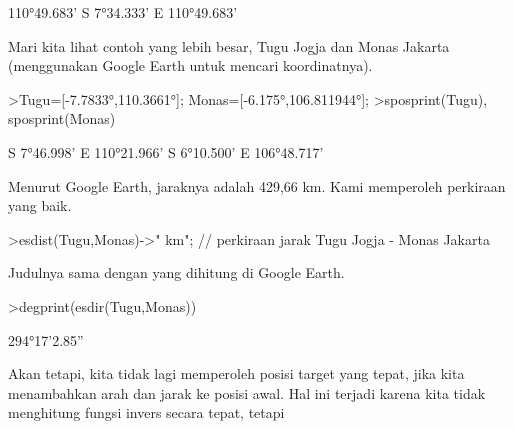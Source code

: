 \documentclass[a4paper,10pt]{article}
\begin{document}
\begin{eulernotebook}
\begin{eulercomment}
\begin{eulercomment}
\begin{eulercomment}
\begin{eulercomment}
\begin{eulercomment}
\begin{eulercomment}
\begin{eulercomment}
\begin{eulercomment}
\begin{eulercomment}
\begin{eulercomment}
\begin{eulercomment}
\begin{eulercomment}
\begin{eulercomment}
\begin{eulercomment}
\begin{eulercomment}
\begin{eulercomment}
\begin{eulercomment}
\begin{eulercomment}
\begin{eulercomment}
\begin{eulercomment}
\begin{eulercomment}
\begin{eulercomment}
\begin{eulercomment}
\begin{eulercomment}
\begin{eulercomment}
\begin{eulercomment}
\begin{eulercomment}
\begin{eulercomment}
\begin{eulercomment}
\begin{eulercomment}
\begin{eulercomment}
\begin{eulercomment}
\begin{eulercomment}
\begin{eulercomment}
\begin{eulercomment}
\begin{eulercomment}
\begin{eulercomment}
\begin{eulercomment}
\begin{eulercomment}
\begin{eulercomment}
\begin{eulercomment}
\begin{eulercomment}
\begin{eulercomment}
\begin{eulercomment}
\begin{eulercomment}
\begin{eulercomment}
\begin{eulercomment}
\begin{eulercomment}
\begin{eulercomment}
\begin{eulercomment}
\begin{eulercomment}
\begin{eulercomment}
\begin{eulercomment}
\begin{eulercomment}
\begin{eulercomment}
\begin{eulercomment}
\begin{eulercomment}
\begin{eulercomment}
\begin{eulercomment}
\begin{eulercomment}
\begin{eulercomment}
\begin{eulercomment}
\begin{eulercomment}
\begin{eulercomment}
\begin{euleroutput}
110°49.683'
  S 7°34.333' E 110°49.683'
\end{euleroutput}
\begin{eulercomment}
Mari kita lihat contoh yang lebih besar, Tugu Jogja dan Monas Jakarta
(menggunakan Google Earth untuk mencari koordinatnya).
\end{eulercomment}
\begin{eulerprompt}
>Tugu=[-7.7833°,110.3661°]; Monas=[-6.175°,106.811944°];
>sposprint(Tugu), sposprint(Monas)
\end{eulerprompt}
\begin{euleroutput}
  S 7°46.998' E 110°21.966'
  S 6°10.500' E 106°48.717'
\end{euleroutput}
\begin{eulercomment}
Menurut Google Earth, jaraknya adalah 429,66 km. Kami memperoleh
perkiraan yang baik.
\end{eulercomment}
\begin{eulerprompt}
>esdist(Tugu,Monas)->" km"; // perkiraan jarak Tugu Jogja - Monas Jakarta
\end{eulerprompt}
\begin{eulercomment}
Judulnya sama dengan yang dihitung di Google Earth.
\end{eulercomment}
\begin{eulerprompt}
>degprint(esdir(Tugu,Monas))
\end{eulerprompt}
\begin{euleroutput}
  294°17'2.85''
\end{euleroutput}
\begin{eulercomment}
Akan tetapi, kita tidak lagi memperoleh posisi target yang tepat, jika
kita menambahkan arah dan jarak ke posisi awal. Hal ini terjadi karena
kita tidak menghitung fungsi invers secara tepat, tetapi 
\end{eulercomment}
\end{eulercomment}
\end{eulercomment}
\end{eulercomment}
\end{eulercomment}
\end{eulercomment}
\end{eulercomment}
\end{eulercomment}
\end{eulercomment}
\end{eulercomment}
\end{eulercomment}
\end{eulercomment}
\end{eulercomment}
\end{eulercomment}
\end{eulercomment}
\end{eulercomment}
\end{eulercomment}
\end{eulercomment}
\end{eulercomment}
\end{eulercomment}
\end{eulercomment}
\end{eulercomment}
\end{eulercomment}
\end{eulercomment}
\end{eulercomment}
\end{eulercomment}
\end{eulercomment}
\end{eulercomment}
\end{eulercomment}
\end{eulercomment}
\end{eulercomment}
\end{eulercomment}
\end{eulercomment}
\end{eulercomment}
\end{eulercomment}
\end{eulercomment}
\end{eulercomment}
\end{eulercomment}
\end{eulercomment}
\end{eulercomment}
\end{eulercomment}
\end{eulercomment}
\end{eulercomment}
\end{eulercomment}
\end{eulercomment}
\end{eulercomment}
\end{eulercomment}
\end{eulercomment}
\end{eulercomment}
\end{eulercomment}
\end{eulercomment}
\end{eulercomment}
\end{eulercomment}
\end{eulercomment}
\end{eulercomment}
\end{eulercomment}
\end{eulercomment}
\end{eulercomment}
\end{eulercomment}
\end{eulercomment}
\end{eulercomment}
\end{eulercomment}
\end{eulercomment}
\end{eulercomment}
\end{eulercomment}
\end{eulernotebook}
\end{document}

